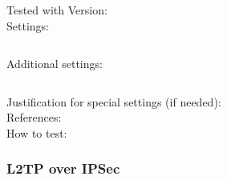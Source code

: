\begin{description}
\item[Tested with Version:] 

\item[Settings:] \mbox{}

\begin{lstlisting}[breaklines]
    %Here goes your setting string
\end{lstlisting}

\item[Additional settings:] \mbox{}


\begin{lstlisting}[breaklines]
    %copy \& paste additional settings
\end{lstlisting}

\item[Justification for special settings (if needed):] \mbox{}


\item[References:] 


\item[How to test:]

\end{description}





\subsubsection{L2TP over IPSec}



